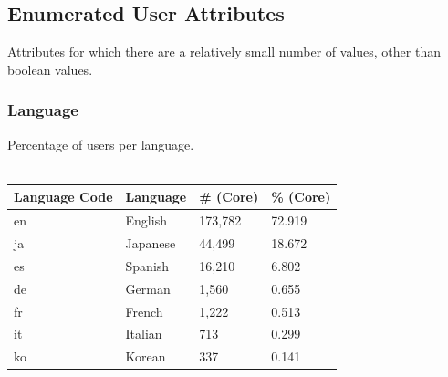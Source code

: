 \subsection{Enumerated User Attributes}
Attributes for which there are a relatively small number of values, other than boolean values.
\subsubsection{Language}
Percentage of users per language.\\\\
\begin{tabular}{| l | l | l | l | }
\hline
\textbf{Language Code} & \textbf{Language} & \textbf{\# (Core)}  & \textbf{\% (Core)} \\ \hline
en & English & 173,782 & 72.919 \\ \hline
ja & Japanese & 44,499 & 18.672 \\ \hline
es & Spanish & 16,210 & 6.802 \\ \hline
de & German & 1,560 & 0.655 \\ \hline
fr & French & 1,222 & 0.513 \\ \hline
it & Italian & 713 & 0.299 \\ \hline
ko & Korean & 337 & 0.141 \\ \hline
\end{tabular}

